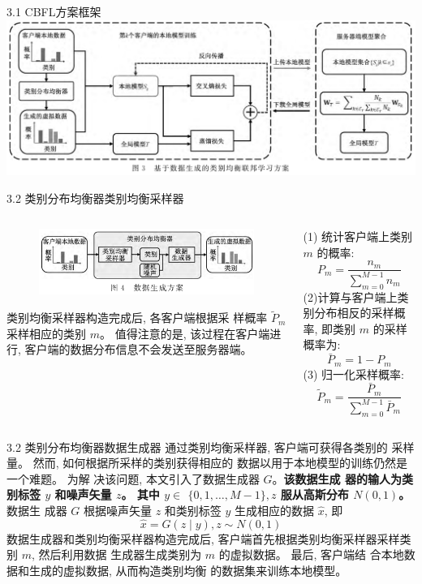 \documentclass{sintefbeamer}
\theoremstyle{definition}
\begin{document}
\begin{frame}{3.1 CBFL方案框架}
\centering
\includegraphics[width=1\textwidth]{images/img_overview}

\end{frame}

	


\begin{frame}{3.2 类别分布均衡器}{类别均衡采样器}


\begin{columns}
\begin{column}{0.5\textwidth}
\begin{figure}[ht]
\centering
\includegraphics[width=1\textwidth]{images/img_gan}
\end{figure}

类别均衡采样器构造完成后, 各客户端根据采 样概率 $\widetilde{P}_m$ 采样相应的类别 $m$。 值得注意的是, 该过程在客户端进行, 客户端的数据分布信息不会发送至服务器端。
\end{column}
\begin{column}{0.5\textwidth}
(1) 统计客户端上类别 $m$ 的概率:
$$
P_m=\frac{n_m}{\sum_{m=0}^{M-1} n_m}
$$
(2)计算与客户端上类别分布相反的采样概率, 即类别 $m$ 的采样概率为:
$$
\bar{P}_m=1-P_m
$$
(3) 归一化采样概率:
$$
\widetilde{P}_m=\frac{\bar{P}_m}{\sum_{m=0}^{M-1} \bar{P}_m}
$$
\end{column}
\end{columns}


\end{frame}


\begin{frame}{3.2 类别分布均衡器}{数据生成器}
通过类别均衡采样器, 客户端可获得各类别的 采样量。 然而, 如何根据所采样的类别获得相应的 数据以用于本地模型的训练仍然是一个难题。 为解 决该问题, 本文引入了数据生成器 $G$。\textbf{该数据生成 器的输人为类别标签 $y$ 和噪声矢量 $z$。 其中 $y \in$ $\{0,1, \ldots, M-1\}, z$ 服从高斯分布 $N(0,1)$。}  数据生 成器 $G$ 根据噪声矢量 $z$ 和类别标签 $y$ 生成相应的数据 $\hat{x}$, 即
$$
\hat{x}=G(z \mid y), z \sim N(0,1) 
$$
数据生成器和类别均衡采样器构造完成后, 客户端首先根据类别均衡采样器采样类别 $m$, 然后利用数据 生成器生成类别为 $m$ 的虚拟数据。 最后, 客户端结 合本地数据和生成的虚拟数据, 从而构造类别均衡 的数据集来训练本地模型。
\end{frame}
\end{document}
